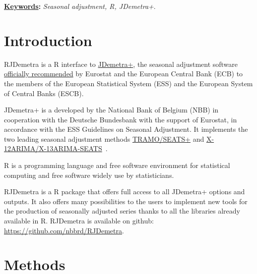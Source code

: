 \documentclass[12pt,a4paper]{article}
\title{
\vspace{-5ex}
\thetitle
\vspace{-2ex}
}
\author{
\theauthors
\vspace{-5ex}
}
\date{}
\def\thekeywords{
\textit{Seasonal adjustment, R, JDemetra+}.
}
\begin{document}
\cfoot{\thepage} %

\sectionfont{\large\textsc}

\maketitle

{\fontsize{10pt}{12.0pt}\selectfont \textbf{\uline{Keywords}:} \thekeywords\par}\par


\section{Introduction}\label{introduction}

RJDemetra is a R interface to
\href{https://github.com/jdemetra/jdemetra-app}{JDemetra+}, the seasonal
adjustment software
\href{https://ec.europa.eu/eurostat/cros/system/files/Jdemetra_\%20release.pdf}{officially
recommended} by Eurostat and the European Central Bank (ECB) to the members of the European Statistical System (ESS) and the European System of Central Banks (ESCB).

JDemetra+ is a developed by the National Bank of Belgium (NBB) in
cooperation with the Deutsche Bundesbank with the support of Eurostat, in accordance with
the ESS Guidelines on Seasonal Adjustment. It implements the two leading seasonal adjustment methods
\href{http://www.bde.es/bde/en/secciones/servicios/Profesionales/Programas_estadi/Programas_estad_d9fa7f3710fd821.html}{TRAMO/SEATS+} \cite{gomez1998automatic,caporello2004program}
and
\href{https://www.census.gov/srd/www/x13as/}{X-12ARIMA/X-13ARIMA-SEATS}~\cite{findleyx12,ladiray1999x11}.

R is a programming language and free software environment for
statistical computing and free software widely use by statisticians.

RJDemetra is a R package that offers full access to all JDemetra+ options and
outputs. It also offers many possibilities to the users to implement new tools for the production of seasonally
adjusted series thanks to all the libraries already available in R. RJDemetra is
available on github: \url{https://github.com/nbbrd/RJDemetra}.

\section{Methods}\label{methods}
\end{document}
